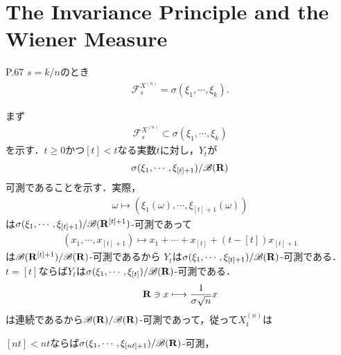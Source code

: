 \section{The Invariance Principle and the Wiener Measure}
	\begin{itembox}[l]{P.67 }
		$s = k/n$のとき
		\begin{align}
			\mathscr{F}_s^{X^{(n)}} = \sigma(\xi_1,\cdots,\xi_k).
		\end{align}
	\end{itembox}
	
	\begin{sketch}
		まず
		\begin{align}
			\mathscr{F}_s^{X^{(n)}} \subset \sigma(\xi_1,\cdots,\xi_k)
			\label{The_Invariance_Principle_and_the_Wiener_Measure_1}
		\end{align}
		を示す．$t \geq 0$かつ$[t] < t$なる実数$t$に対し，$Y_t$が
		\begin{align}
			\sigma(\xi_1,\cdots,\xi_{[t]+1})/\mathscr{B}(\mathbf{R})
		\end{align}
		可測であることを示す．実際，
		\begin{align}
			\omega \longmapsto \left(\xi_1(\omega),\cdots,\xi_{[t]+1}(\omega)\right)
		\end{align}
		は$\sigma(\xi_1,\cdots,\xi_{[t]+1})/\mathscr{B}(\mathbf{R}^{[t]+1})$-可測であって
		\begin{align}
			(x_1,\cdots,x_{[t]+1}) \longmapsto x_1 + \cdots + x_{[t]} + (t-[t])x_{[t] + 1}
		\end{align}
		は$\mathscr{B}(\mathbf{R}^{[t]+1})/\mathscr{B}(\mathbf{R})$-可測であるから
		$Y_t$は$\sigma(\xi_1,\cdots,\xi_{[t]+1})/\mathscr{B}(\mathbf{R})$-可測である．
		$t = [t]$ならば$Y_t$は$\sigma(\xi_1,\cdots,\xi_{[t]})/\mathscr{B}(\mathbf{R})$-可測である．
		\begin{align}
			\mathbf{R} \ni x \longmapsto \frac{1}{\sigma \sqrt{n}} x
		\end{align}
		は連続であるから$\mathscr{B}(\mathbf{R})/\mathscr{B}(\mathbf{R})$-可測であって，従って$X^{(n)}_t$は
		
		$[nt] < nt$ならば$\sigma(\xi_1,\cdots,\xi_{[nt]+1})/\mathscr{B}(\mathbf{R})$-可測，
		

\end{sketch}
